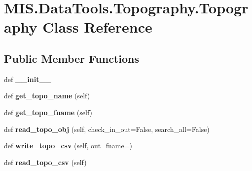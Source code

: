 \hypertarget{classMIS_1_1DataTools_1_1Topography_1_1Topography}{}\section{M\+I\+S.\+Data\+Tools.\+Topography.\+Topography Class Reference}
\label{classMIS_1_1DataTools_1_1Topography_1_1Topography}
\subsection*{Public Member Functions}
\begin{DoxyCompactItemize}
\item 
\mbox{\label{classMIS_1_1DataTools_1_1Topography_1_1Topography_a21f2bd05b8654c2f6ba1d1ea31ab961c}} 
def {\bfseries \+\_\+\+\_\+init\+\_\+\+\_\+}
\item 
\mbox{\label{classMIS_1_1DataTools_1_1Topography_1_1Topography_a7ab807fd652b23e69822b8166ff9e065}} 
def {\bfseries get\+\_\+topo\+\_\+name} (self)
\item 
\mbox{\label{classMIS_1_1DataTools_1_1Topography_1_1Topography_aa213181b9ec9c84d182dd23e57350598}} 
def {\bfseries get\+\_\+topo\+\_\+fname} (self)
\item 
\mbox{\label{classMIS_1_1DataTools_1_1Topography_1_1Topography_ae1cc2d0024f8150406ca3bfbb49eb7d6}} 
def {\bfseries read\+\_\+topo\+\_\+obj} (self, check\+\_\+in\+\_\+out=False, search\+\_\+all=False)
\item 
\mbox{\label{classMIS_1_1DataTools_1_1Topography_1_1Topography_ab3d10b2d00438d30102bc01716270577}} 
def {\bfseries write\+\_\+topo\+\_\+csv} (self, out\+\_\+fname=\textquotesingle{}\textquotesingle{})
\item 
\mbox{\label{classMIS_1_1DataTools_1_1Topography_1_1Topography_ad38f8fee4cf2488bb02a78ff179c784a}} 
def {\bfseries read\+\_\+topo\+\_\+csv} (self)
\item 

\end{DoxyCompactItemize}
